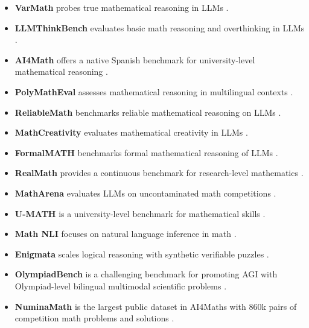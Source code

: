 \documentclass[acmsmall,anonymous]{acmart}
\begin{document}
\begin{itemize}
    \item \textbf{VarMath} probes true mathematical reasoning in LLMs \cite{anonymous2025varmath,anonymous2025varmath}.
    \item \textbf{LLMThinkBench} evaluates basic math reasoning and overthinking in LLMs \cite{anonymous2025llmthinkbench,anonymous2025llmthinkbench}.
    \item \textbf{AI4Math} offers a native Spanish benchmark for university-level mathematical reasoning \cite{perez2025ai4mathnativespanishbenchmark}.
    \item \textbf{PolyMathEval} assesses mathematical reasoning in multilingual contexts \cite{anonymous2025polymatheval,anonymous2025polymatheval}.
    \item \textbf{ReliableMath} benchmarks reliable mathematical reasoning on LLMs \cite{anonymous2025reliablemath,anonymous2025reliablemath}.
    \item \textbf{MathCreativity} evaluates mathematical creativity in LLMs \cite{anonymous2025benchmarkmathcreativity,anonymous2025benchmarkmathcreativity}.
    \item \textbf{FormalMATH} benchmarks formal mathematical reasoning of LLMs \cite{yu2025formalmath}.
    \item \textbf{RealMath} provides a continuous benchmark for research-level mathematics \cite{zhang2025realmath}.
    \item \textbf{MathArena} evaluates LLMs on uncontaminated math competitions \cite{balunovic2025matharena}.
    \item \textbf{U-MATH} is a university-level benchmark for mathematical skills \cite{chernyshev-etal-2025-u,depaiva2025mathnli,anonymous2025enigmata,he2024bolympiadbench,li2024c numinamath,toshniwal2024a openmathinstruct2,toshniwal2024b openmathinstruct1,paster2024openwebmath,wei2023cmath,liu2023augmenting,huang2024key,fang2024,kurtic2024,mao2024,mirzadeh2024,zeng2024,han2024,liu2024b,liang2024c,lu2024b,chernyshev2024,lu2024c}.
    \item \textbf{Math NLI} focuses on natural language inference in math \cite{depaiva2025mathnli}.
    \item \textbf{Enigmata} scales logical reasoning with synthetic verifiable puzzles \cite{anonymous2025enigmata}.
    \item \textbf{OlympiadBench} is a challenging benchmark for promoting AGI with Olympiad-level bilingual multimodal scientific problems \cite{he2024bolympiadbench}.
    \item \textbf{NuminaMath} is the largest public dataset in AI4Maths with 860k pairs of competition math problems and solutions \cite{li2024c numinamath}.

\end{itemize}
\end{document}
